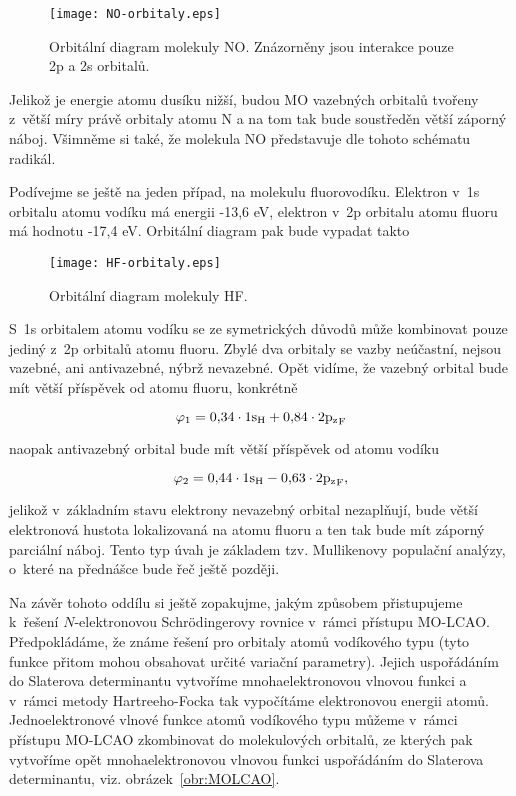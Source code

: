 \begin{figure} [htb]
\centering
\texttt{[image: NO-orbitaly.eps]}
\caption[Orbitaly NO]{Orbitální diagram molekuly NO. Znázorněny jsou interakce pouze 2p a 2s orbitalů.}
\label{obr:NO-orbitaly}
\end{figure}

\noindent Jelikož je energie atomu dusíku nižší, budou MO vazebných orbitalů tvořeny z~větší míry právě orbitaly atomu N a na tom tak bude soustředěn větší záporný náboj. Všimněme si také, že molekula NO představuje dle tohoto schématu radikál.


Podívejme se ještě na jeden případ, na molekulu fluorovodíku. Elektron v~1s orbitalu atomu vodíku má energii -13,6 eV, elektron v~2p orbitalu atomu fluoru má hodnotu -17,4 eV. Orbitální diagram pak bude vypadat takto

\begin{figure} [htb]
\centering
\texttt{[image: HF-orbitaly.eps]}
\caption[Orbitaly HF]{Orbitální diagram molekuly HF.}
\label{obr:HF-orbitaly}
\end{figure}

\noindent S~1s orbitalem atomu vodíku se ze symetrických důvodů může kombinovat pouze jediný z~2p orbitalů atomu fluoru. Zbylé dva orbitaly se vazby neúčastní, nejsou vazebné, ani antivazebné, nýbrž nevazebné. Opět vidíme, že vazebný orbital bude mít větší příspěvek  od atomu fluoru, konkrétně

\begin{equation}
\varphi_1 = 0{,}34 \cdot 1 \mathrm{s}_{\mathrm{H}} + 0{,}84 \cdot 2 \mathrm{p_z}_{\mathrm{F}}
\label{rov:ElStrukt-22}
\end{equation}


\noindent naopak antivazebný orbital bude mít větší příspěvek od atomu vodíku

\begin{equation}
\varphi_2 = 0{,}44 \cdot 1 \mathrm{s}_{\mathrm{H}} - 0{,}63 \cdot 2 \mathrm{p_z}_{\mathrm{F}},
\label{rov:ElStrukt-23}
\end{equation}


\noindent jelikož v~základním stavu elektrony nevazebný orbital nezaplňují, bude větší elektronová hustota lokalizovaná na atomu fluoru a ten tak bude mít záporný parciální náboj. Tento typ úvah je základem tzv. Mullikenovy populační analýzy, o~které na přednášce bude řeč ještě později.


Na závěr tohoto oddílu si ještě zopakujme, jakým způsobem přistupujeme k~řešení $N$-elektronovou Schr\"odingerovy rovnice v~rámci přístupu MO-LCAO. Předpokládáme, že známe řešení pro orbitaly atomů vodíkového typu (tyto funkce přitom mohou obsahovat určité variační parametry). Jejich uspořádáním do Slaterova determinantu vytvoříme mnohaelektronovou vlnovou funkci a v~rámci metody Hartreeho-Focka tak vypočítáme elektronovou energii atomů. Jednoelektronové vlnové funkce atomů vodíkového typu můžeme v~rámci přístupu MO-LCAO zkombinovat do molekulových orbitalů, ze kterých pak vytvoříme opět mnohaelektronovou vlnovou funkci uspořádáním do Slaterova determinantu, viz. obrázek~\ref{obr:MOLCAO}.

